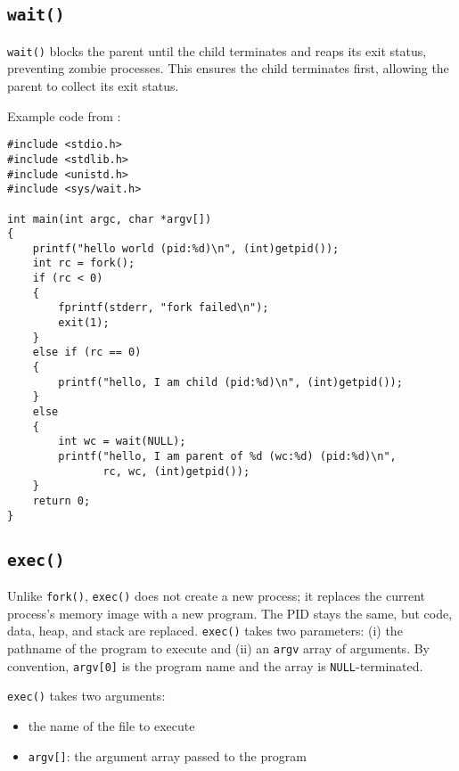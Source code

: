 \subsection{\texttt{wait()}}
\texttt{wait()} blocks the parent until the child terminates and reaps its exit status, preventing zombie processes.
This ensures the child terminates first, allowing the parent to collect its exit status.

Example code from \cite{ArpaciDusseau23-Book}:
\begin{center}
    \begin{minipage}{0.9\linewidth}
        \begin{verbatim}
#include <stdio.h>
#include <stdlib.h>
#include <unistd.h>
#include <sys/wait.h>

int main(int argc, char *argv[])
{
    printf("hello world (pid:%d)\n", (int)getpid());
    int rc = fork();
    if (rc < 0)
    {
        fprintf(stderr, "fork failed\n");
        exit(1);
    }
    else if (rc == 0)
    {
        printf("hello, I am child (pid:%d)\n", (int)getpid());
    }
    else
    {
        int wc = wait(NULL);
        printf("hello, I am parent of %d (wc:%d) (pid:%d)\n",
               rc, wc, (int)getpid());
    }
    return 0;
}
\end{verbatim}
    \end{minipage}
\end{center}

\subsection{\texttt{exec()}}
Unlike \texttt{fork()}, \texttt{exec()} does not create a new process; it replaces the current process's memory image with a new
program. The PID stays the same, but code, data, heap, and stack are replaced.
\texttt{exec()} takes two parameters: (i) the pathname of the program to execute and (ii) an \texttt{argv} array of arguments.
By convention, \texttt{argv[0]} is the program name and the array is \texttt{NULL}-terminated.

\texttt{exec()} takes two arguments:
\begin{itemize}
    \item the name of the file to execute
    \item \texttt{argv[]}: the argument array passed to the program
\end{itemize}

